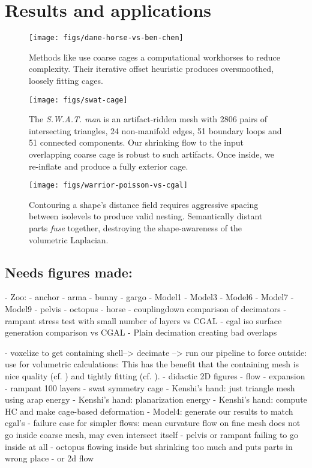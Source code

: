 
\section{Results and applications}
\label{sec:results}



\begin{figure}
  \texttt{[image: figs/dane-horse-vs-ben-chen]}
  \caption{Methods like \protect\cite{Ben-Chen:2009:SDT} use coarse cages a
  computational workhorses to reduce complexity. Their iterative offset
  heuristic produces oversmoothed, loosely fitting cages.}
  \label{fig:dane-vs-ben-chen}
\end{figure}

\begin{figure}
  \texttt{[image: figs/swat-cage]}
  \caption{The \emph{S.W.A.T. man} is an artifact-ridden mesh with 2806 pairs
  of intersecting triangles, 24 non-manifold edges, 51 boundary loops and 51
  connected components. Our shrinking flow to the input overlapping coarse cage
  is robust to such artifacts. Once inside, we re-inflate and produce a fully
  exterior cage.}
  \label{fig:swat-cage}
\end{figure}

\begin{figure}
  \texttt{[image: figs/warrior-poisson-vs-cgal]}
  \caption{Contouring a shape's distance field requires aggressive spacing
  between isolevels to produce valid nesting. Semantically distant parts
  \emph{fuse} together, destroying the shape-awareness of the volumetric
  Laplacian.} 
  \label{fig:warrior-poisson}
\end{figure}

\subsection{Needs figures made:}
- Zoo:
  - anchor
  - arma
  - bunny
  - gargo
  - Model1
  - Model3
  - Model6
  - Model7
  - Model9
  - pelvis
  - octopus
  - horse
- couplingdown comparison of decimators
- rampant stress test with small number of layers vs CGAL
- cgal iso surface generation comparison vs CGAL
- Plain decimation creating bad overlaps

- voxelize to get containing shell--> decimate --> run our pipeline to force
  outside: use for volumetric calculations: This has the benefit that the
  containing mesh is nice quality (cf. \cite{Jacobson:WN:2013}) and tightly
  fitting (cf. \cite{Xu:2014:SDF}).
- didactic 2D figures
  - flow
  - expansion
- rampant 100 layers
- swat symmetry cage
- Kenshi's hand: just triangle mesh using arap energy
- Kenshi's hand: planarization energy 
- Kenshi's hand: compute HC and make cage-based deformation
- Model4: generate our results to match cgal's
- failure case for simpler flows: mean curvature flow on fine mesh does not
  go inside coarse mesh, may even intersect itself
    - pelvis or rampant failing to go inside at all
    - octopus flowing inside but shrinking too much and puts parts in wrong
      place
    - or 2d flow

